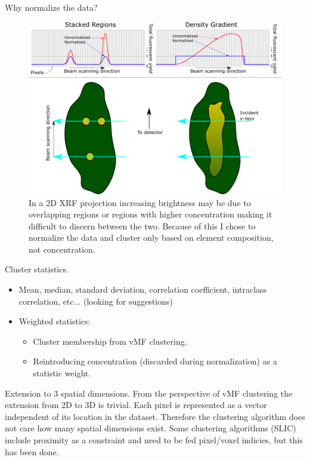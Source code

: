 \documentclass[
]{beamer}
\begin{document}
\begin{frame}{Why normalize the data?}
\begin{figure}[h]
  \includegraphics[width=1\textwidth,height=.5\textheight,keepaspectratio]{Normalization.png}
  \caption{In a 2D XRF projection increasing brightness may be due to overlapping regions or regions with higher concentration making it difficult to discern between the two. Because of this I chose to normalize the data and cluster only based on element composition, not concentration.}
\end{figure}
\end{frame}

\begin{frame}{Cluster statistics.}
\begin{itemize}
\item Mean, median, standard deviation, correlation coefficient, intraclass correlation, etc... (looking for suggestions)
\item Weighted statistics:
\begin{itemize}
	\item Cluster membership from vMF clustering.
    \item Reintroducing concentration (discarded during normalization) as a statistic weight.
\end{itemize}
\end{itemize}
\end{frame}

\begin{frame}{Extension to 3 spatial dimensions.}
From the perspective of vMF clustering the extension from 2D to 3D is trivial. Each pixel is represented as a vector independent of its location in the dataset. Therefore the clustering algorithm does not care how many spatial dimensions exist. Some clustering algorithms (SLIC) include proximity as a constraint and need to be fed pixel/voxel indicies, but this has been done.
\end{frame}
\end{document}
